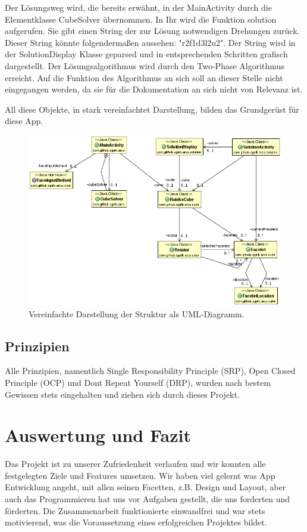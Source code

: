 Der Lösungsweg wird, die bereits erwähnt, in der MainActivity durch die Elementklasse CubeSolver
übernommen. In Ihr wird die Funktion solution aufgerufen. Sie gibt einen String der zur
Lösung notwendigen Drehungen zurück. Dieser String könnte folgendermaßen aussehen: "r2f1d3l2u2". Der String wird
in der SolutionDisplay Klasse geparsed und in entsprechenden Schritten grafisch dargestellt.
Der Lösungsalgorithmus wird durch den Two-Phase Algorithmus erreicht. Auf die Funktion des Algorithmus
an sich soll an dieser Stelle nicht eingegangen werden, da sie für die Dokumentation an sich nicht von Relevanz ist.

All diese Objekte, in stark vereinfachtet Darstellung, bilden das Grundgerüst
für diese App.
\begin{figure}
	\centering
	\includegraphics[width=\textwidth]{pics/uml.png}
	\caption{Vereinfachte Darstellung der Struktur als UML-Diagramm.}
	\label{fig:uml}
\end{figure}

\subsection{Prinzipien}  %
Alle Prinzipien, namentlich Single Responsibility Principle (SRP), Open Closed
Principle (OCP) und Dont Repeat Yourself (DRP), wurden nach bestem Gewissen stets
eingehalten und ziehen sich durch dieses Projekt.

\clearpage

\section{Auswertung und Fazit}  %
Das Projekt ist zu unserer Zufriedenheit verlaufen und wir konnten alle festgelegten
Ziele und Features umsetzen. Wir haben viel gelernt was App Entwicklung angeht, mit
allen seinen Facetten, z.B. Design und Layout, aber auch das Programmieren hat uns
vor Aufgaben gestellt, die uns forderten und förderten.
Die Zusammenarbeit funktionierte einwandfrei
und war stets motivierend, was die Voraussetzung eines erfolgreichen Projektes bildet.

\appendix
\printbibliography[heading=bibintoc,title={Quellenverzeichnis}]
\clearpage
\listoffigures



